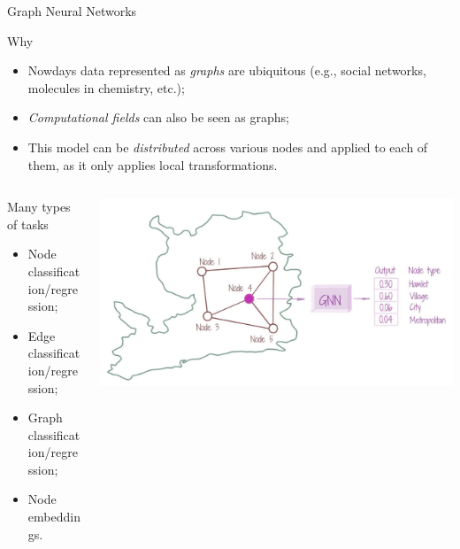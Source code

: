 \documentclass[presentation]{beamer}\mode<presentation>{\usetheme{AMSBolognaFC}}
\begin{document}
\begin{frame}[c]{Graph Neural Networks}

\begin{block}{Why}
	\begin{itemize}
		\item Nowdays data represented as \emph{graphs} are ubiquitous 
			(e.g., social networks, molecules in chemistry, etc.);
		\item \emph{Computational fields} can also be seen as graphs;
		\item This model can be \emph{distributed} across various nodes and applied to each of them, 
			as it only applies local transformations.
	\end{itemize}
\end{block}

\begin{columns}
	\begin{column}{0.5\textwidth}
		\begin{alertblock}{Many types of tasks}
			\begin{itemize}
				\item Node classification/regression;
				\item Edge classification/regression;
				\item Graph classification/regression;
				\item Node embeddings.
			\end{itemize}
		\end{alertblock}
	\end{column}
	\begin{column}{0.5\textwidth}
		\includegraphics[width=\textwidth]{img/gnn.png}
	\end{column}
\end{columns}


\end{frame}
\end{document}
